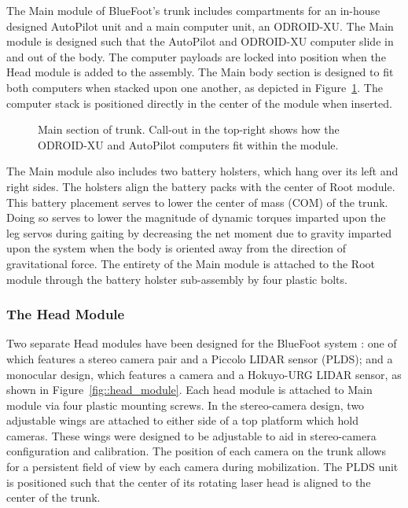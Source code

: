 				The Main module of BlueFoot's trunk includes compartments for an in-house designed AutoPilot unit and a main computer unit, an ODROID-XU. The Main module is designed such that the AutoPilot and ODROID-XU computer slide in and out of the body. The computer payloads are locked into position when the Head module is added to the assembly. The Main body section is designed to fit both computers when stacked upon one another, as depicted in Figure~\ref{fig::main_module}. The computer stack is positioned directly in the center of the module when inserted.
%
				\begin{figure}[h!]
					\centering
					\caption{Main section of trunk. Call-out in the top-right shows how the ODROID-XU and AutoPilot computers fit within the module.}
					\label{fig::main_module}
				\end{figure}

			
				The Main module also includes two battery holsters, which hang over its left and right sides. The holsters align the battery packs with the center of Root module. This battery placement serves to lower the center of mass (COM) of the trunk. Doing so serves to lower the magnitude of dynamic torques imparted upon the leg servos during gaiting by decreasing the net moment due to gravity imparted upon the system when the body is oriented away from the direction of gravitational force. The entirety of the Main module is attached to the Root module through the battery holster sub-assembly by four plastic bolts.
		
			\subsubsection{The Head Module}

				Two separate Head modules have been designed for the BlueFoot system : one of which features a stereo camera pair and a Piccolo LIDAR sensor (PLDS); and a monocular design, which features a camera and a Hokuyo-URG LIDAR sensor, as shown in Figure~\ref{fig::head_module}. Each head module is attached to Main module via four plastic mounting screws. In the stereo-camera design, two adjustable wings are attached to either side of a top platform which hold cameras. These wings were designed to be adjustable to aid in stereo-camera configuration and calibration. The position of each camera on the trunk allows for a persistent field of view by each camera during mobilization. The PLDS unit is positioned such that the center of its rotating laser head is aligned to the center of the trunk. 

